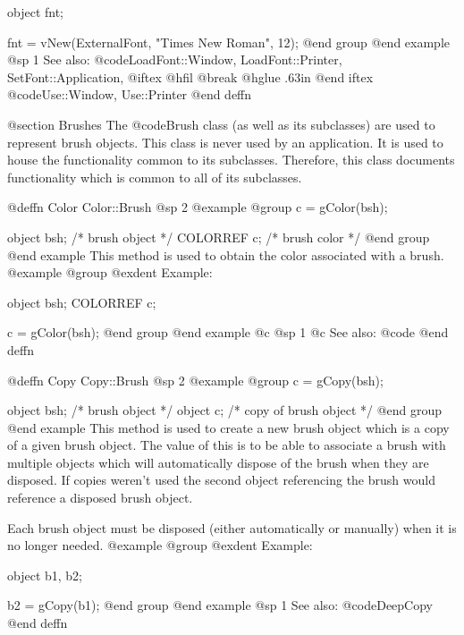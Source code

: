 object  fnt;

fnt = vNew(ExternalFont, "Times New Roman", 12);
@end group
@end example
@sp 1
See also:  @code{LoadFont::Window, LoadFont::Printer, SetFont::Application,}
@iftex
@hfil @break @hglue .63in 
@end iftex
@code{Use::Window, Use::Printer}
@end deffn









@section Brushes
The @code{Brush} class (as well as its subclasses) are used to represent
brush objects.  This class is never used by an application.  It is used
to house the functionality common to its subclasses.  Therefore, this
class documents functionality which is common to all of its subclasses.









@deffn {Color} Color::Brush
@sp 2
@example
@group
c = gColor(bsh);

object    bsh;  /*  brush object   */
COLORREF  c;    /*  brush color    */
@end group
@end example
This method is used to obtain the color associated with a brush.
@example
@group
@exdent Example:

object  bsh;
COLORREF  c;

c = gColor(bsh);
@end group
@end example
@c @sp 1
@c See also:  @code{}
@end deffn










@deffn {Copy} Copy::Brush
@sp 2
@example
@group
c = gCopy(bsh);

object  bsh;    /*  brush object          */
object  c;      /*  copy of brush object  */
@end group
@end example
This method is used to create a new brush object which is a copy of a
given brush object.  The value of this is to be able to associate a
brush with multiple objects which will automatically dispose of the
brush when they are disposed.  If copies weren't used the second object
referencing the brush would reference a disposed brush object.

Each brush object must be disposed (either automatically or manually)
when it is no longer needed.
@example
@group
@exdent Example:

object  b1, b2;

b2 = gCopy(b1);
@end group
@end example
@sp 1
See also:  @code{DeepCopy}
@end deffn









